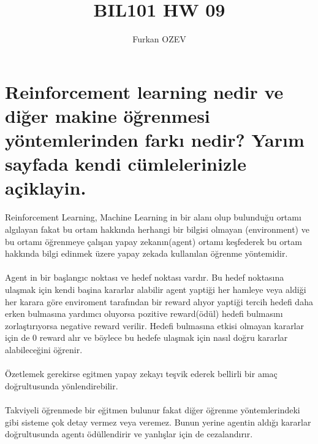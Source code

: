 \documentclass[a4paper, 12pt]{article}
\title{BIL101 HW 09}
\author{Furkan OZEV}
\begin{document}
\maketitle
\section{Reinforcement learning nedir ve diğer makine öğrenmesi yöntemlerinden farkı nedir? Yarım sayfada kendi cümlelerinizle açiklayin.}
Reinforcement Learning, Machine Learning in bir alanı olup bulunduğu ortamı algılayan fakat bu ortam hakkında herhangi bir bilgisi olmayan (environment) ve bu ortamı öğrenmeye çalışan yapay zekanın(agent) ortamı keşfederek bu ortam hakkında bilgi edinmek üzere yapay zekada kullanılan öğrenme yöntemidir.\\ \\
Agent in bir başlangıc noktası ve hedef noktası vardır. Bu hedef noktasına ulaşmak için kendi başina kararlar alabilir agent yaptiği her hamleye veya aldiği her karara göre enviroment tarafından bir reward alıyor yaptiği tercih hedefi daha erken bulmasına yardımcı oluyorsa pozitive reward(ödül) hedefi bulmasını zorlaştırıyorsa negative reward verilir. Hedefi bulmasına etkisi olmayan kararlar için de 0 reward alır ve böylece bu hedefe ulaşmak için nasıl doğru kararlar alabileceğini öğrenir.\\ \\
Özetlemek gerekirse egitmen yapay zekayı teşvik ederek bellirli bir amaç doğrultusunda yönlendirebilir.\\ \\
Takviyeli öğrenmede bir eğitmen bulunur fakat diğer öğrenme yöntemlerindeki gibi sisteme çok detay vermez veya veremez. Bunun yerine agentin aldığı kararlar doğrultusunda agentı ödüllendirir ve yanlışlar için de cezalandırır.
\newpage
\end{document}
